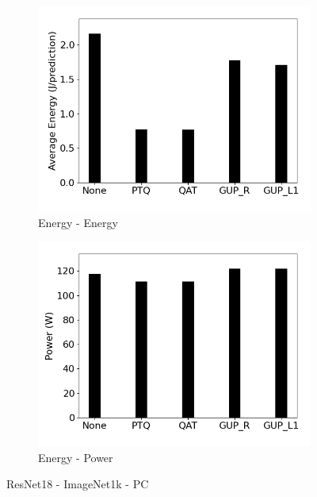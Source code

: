 \begin{figure}[]
\begin{subfigure}{0.19\textwidth}
        \includegraphics[width=1\textwidth]{other/figures/Resnet18_ImageNet1k_PC/Energy.png}
        \caption{Energy -  Energy}
    \end{subfigure}
    \begin{subfigure}{0.19\textwidth}
        \includegraphics[width=1\textwidth]{other/figures/Resnet18_ImageNet1k_PC/Power.png}
        \caption{Energy - Power}
    \end{subfigure}
    \caption{ResNet18 - ImageNet1k - PC}
    \label{fig:Resnet-imagenet-pc}
\end{figure}

